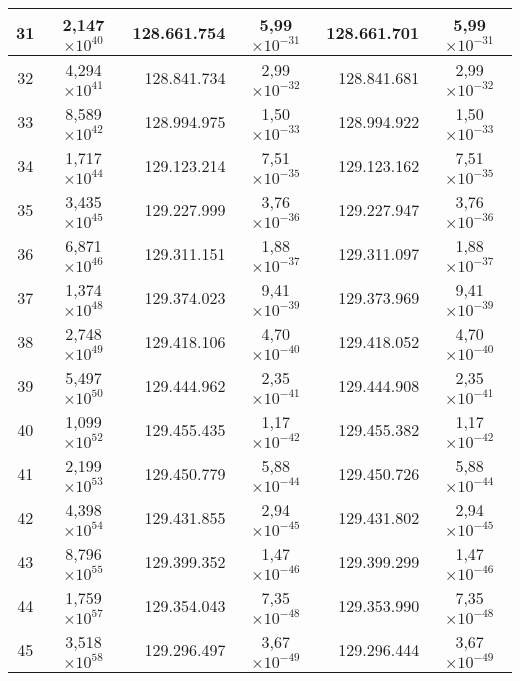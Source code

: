 \begin{table}[!hbt]
\begin{tabular}{| c  r  r  c  r  c |}
    31 & \multicolumn{1}{c}{2,147$\times 10^{40}$} & 128.661.754 & 5,99$\times 10^{-31}$ & 128.661.701 & 5,99$\times 10^{-31}$ \\ \hline
    32 & \multicolumn{1}{c}{4,294$\times 10^{41}$} & 128.841.734 & 2,99$\times 10^{-32}$ & 128.841.681 & 2,99$\times 10^{-32}$ \\ \hline  
    33 & \multicolumn{1}{c}{8,589$\times 10^{42}$} & 128.994.975 & 1,50$\times 10^{-33}$ & 128.994.922 & 1,50$\times 10^{-33}$ \\ \hline
    34 & \multicolumn{1}{c}{1,717$\times 10^{44}$} & 129.123.214 & 7,51$\times 10^{-35}$ & 129.123.162 & 7,51$\times 10^{-35}$ \\ \hline  
    35 & \multicolumn{1}{c}{3,435$\times 10^{45}$} & 129.227.999 & 3,76$\times 10^{-36}$ & 129.227.947 & 3,76$\times 10^{-36}$ \\ \hline
    36 & \multicolumn{1}{c}{6,871$\times 10^{46}$} & 129.311.151 & 1,88$\times 10^{-37}$ & 129.311.097 & 1,88$\times 10^{-37}$ \\ \hline  
    37 & \multicolumn{1}{c}{1,374$\times 10^{48}$} & 129.374.023 & 9,41$\times 10^{-39}$ & 129.373.969 & 9,41$\times 10^{-39}$ \\ \hline
    38 & \multicolumn{1}{c}{2,748$\times 10^{49}$} & 129.418.106 & 4,70$\times 10^{-40}$ & 129.418.052 & 4,70$\times 10^{-40}$ \\ \hline  
    39 & \multicolumn{1}{c}{5,497$\times 10^{50}$} & 129.444.962 & 2,35$\times 10^{-41}$ & 129.444.908 & 2,35$\times 10^{-41}$ \\ \hline
    40 & \multicolumn{1}{c}{1,099$\times 10^{52}$} & 129.455.435 & 1,17$\times 10^{-42}$ & 129.455.382 & 1,17$\times 10^{-42}$ \\ \hline  
    41 & \multicolumn{1}{c}{2,199$\times 10^{53}$} & 129.450.779 & 5,88$\times 10^{-44}$ & 129.450.726 & 5,88$\times 10^{-44}$ \\ \hline
    42 & \multicolumn{1}{c}{4,398$\times 10^{54}$} & 129.431.855 & 2,94$\times 10^{-45}$ & 129.431.802 & 2,94$\times 10^{-45}$ \\ \hline  
    43 & \multicolumn{1}{c}{8,796$\times 10^{55}$} & 129.399.352 & 1,47$\times 10^{-46}$ & 129.399.299 & 1,47$\times 10^{-46}$ \\ \hline
    44 & \multicolumn{1}{c}{1,759$\times 10^{57}$} & 129.354.043 & 7,35$\times 10^{-48}$ & 129.353.990 & 7,35$\times 10^{-48}$ \\ \hline  
    45 & \multicolumn{1}{c}{3,518$\times 10^{58}$} & 129.296.497 & 3,67$\times 10^{-49}$ & 129.296.444 & 3,67$\times 10^{-49}$ \\ \hline

\end{tabular}
\end{table}
